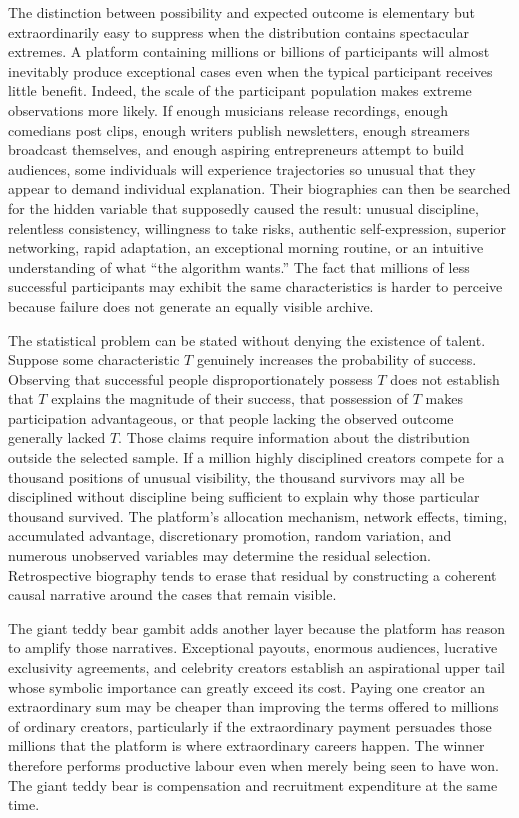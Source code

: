 \documentclass[11pt]{article}
\begin{document}
The distinction between possibility and expected outcome is elementary but extraordinarily easy to suppress when the distribution contains spectacular extremes. A platform containing millions or billions of participants will almost inevitably produce exceptional cases even when the typical participant receives little benefit. Indeed, the scale of the participant population makes extreme observations more likely. If enough musicians release recordings, enough comedians post clips, enough writers publish newsletters, enough streamers broadcast themselves, and enough aspiring entrepreneurs attempt to build audiences, some individuals will experience trajectories so unusual that they appear to demand individual explanation. Their biographies can then be searched for the hidden variable that supposedly caused the result: unusual discipline, relentless consistency, willingness to take risks, authentic self-expression, superior networking, rapid adaptation, an exceptional morning routine, or an intuitive understanding of what ``the algorithm wants.'' The fact that millions of less successful participants may exhibit the same characteristics is harder to perceive because failure does not generate an equally visible archive.

The statistical problem can be stated without denying the existence of talent. Suppose some characteristic \(T\) genuinely increases the probability of success. Observing that successful people disproportionately possess \(T\) does not establish that \(T\) explains the magnitude of their success, that possession of \(T\) makes participation advantageous, or that people lacking the observed outcome generally lacked \(T\). Those claims require information about the distribution outside the selected sample. If a million highly disciplined creators compete for a thousand positions of unusual visibility, the thousand survivors may all be disciplined without discipline being sufficient to explain why those particular thousand survived. The platform's allocation mechanism, network effects, timing, accumulated advantage, discretionary promotion, random variation, and numerous unobserved variables may determine the residual selection. Retrospective biography tends to erase that residual by constructing a coherent causal narrative around the cases that remain visible.

The giant teddy bear gambit adds another layer because the platform has reason to amplify those narratives. Exceptional payouts, enormous audiences, lucrative exclusivity agreements, and celebrity creators establish an aspirational upper tail whose symbolic importance can greatly exceed its cost. Paying one creator an extraordinary sum may be cheaper than improving the terms offered to millions of ordinary creators, particularly if the extraordinary payment persuades those millions that the platform is where extraordinary careers happen. The winner therefore performs productive labour even when merely being seen to have won. The giant teddy bear is compensation and recruitment expenditure at the same time.
\end{document}
